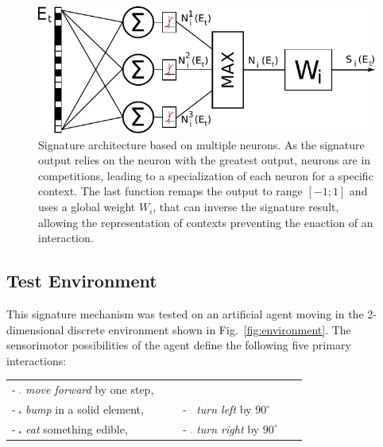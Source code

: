 \documentclass[conference]{IEEEtran}
\begin{document}
\begin{figure}[htbp]
\centerline{\includegraphics[scale=0.55]{img/signature_model2.pdf}}
\caption{Signature architecture based on multiple neurons. As the signature output relies on the neuron with the greatest output, neurons are in competitions, leading to a specialization of each neuron for a specific context. The last function remaps the output to range $[-1;1]$ and uses a global weight $W_i$, that can inverse the signature result, allowing the representation of contexts preventing the enaction of an interaction.}
\label{fig:neuron}
\end{figure}

\subsection{Test Environment}\label{implementation}

This signature mechanism was tested on an artificial agent moving in the 2-dimensional discrete environment shown in Fig.~\ref{fig:environment}.
The sensorimotor possibilities of the agent define the following five primary interactions:

 \begin{tabular}{ l l }
   - \includegraphics[width=0.015\textwidth]{img/mf0.pdf} \textit{move forward} by one step, \\
   - \includegraphics[width=0.015\textwidth]{img/mf1.pdf} \textit{bump} in a solid element, &
   - \includegraphics[width=0.02\textwidth]{img/lt0.pdf} \textit{turn left} by $90^\circ$\\
   - \includegraphics[width=0.015\textwidth]{img/mf2.pdf} \textit{eat} something edible, &
   - \includegraphics[width=0.02\textwidth]{img/rt0.pdf} \textit{turn right} by $90^\circ$\\
 \end{tabular}
\end{document}

